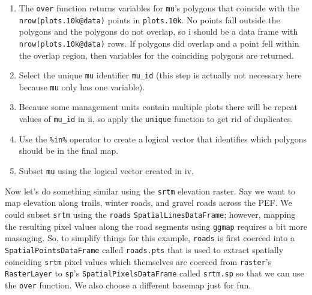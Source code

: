 \documentclass[
]{krantz}
\newenvironment{Shaded}{\begin{snugshade}}{\end{snugshade}}
\newcommand{\FloatTok}[1]{\textcolor[rgb]{0.00,0.00,0.81}{#1}}
\newcommand{\KeywordTok}[1]{\textcolor[rgb]{0.13,0.29,0.53}{\textbf{#1}}}
\newcommand{\NormalTok}[1]{#1}
\newcommand{\OperatorTok}[1]{\textcolor[rgb]{0.81,0.36,0.00}{\textbf{#1}}}
\newcommand{\StringTok}[1]{\textcolor[rgb]{0.31,0.60,0.02}{#1}}
\providecommand{\tightlist}{%
  \setlength{\itemsep}{0pt}\setlength{\parskip}{0pt}}
\begin{document}
\begin{Shaded}
\end{Shaded}

\begin{enumerate}
\def\labelenumi{\roman{enumi}.}
\tightlist
\item
  The \texttt{over} function returns variables for \texttt{mu}'s polygons that coincide with the \texttt{nrow(plots.10k@data)} points in \texttt{plots.10k}. No points fall outside the polygons and the polygons do not overlap, so i should be a data frame with \texttt{nrow(plots.10k@data)} rows. If polygons did overlap and a point fell within the overlap region, then variables for the coinciding polygons are returned.
\item
  Select the unique \texttt{mu} identifier \texttt{mu\_id} (this step is actually not necessary here because \texttt{mu} only has one variable).
\item
  Because some management units contain multiple plots there will be repeat values of \texttt{mu\_id} in ii, so apply the \texttt{unique} function to get rid of duplicates.
\item
  Use the \texttt{\%in\%} operator to create a logical vector that identifies which polygons should be in the final map.
\item
  Subset \texttt{mu} using the logical vector created in iv.
\end{enumerate}

Now let's do something similar using the \texttt{srtm} elevation raster. Say we want to map elevation along trails, winter roads, and gravel roads across the PEF. We could subset \texttt{srtm} using the \texttt{roads} \texttt{SpatialLinesDataFrame}; however, mapping the resulting pixel values along the road segments using \texttt{ggmap} requires a bit more massaging. So, to simplify things for this example, \texttt{roads} is first coerced into a \texttt{SpatialPointsDataFrame} called \texttt{roads.pts} that is used to extract spatially coinciding \texttt{srtm} pixel values which themselves are coerced from \texttt{raster}'s \texttt{RasterLayer} to \texttt{sp}'s \texttt{SpatialPixelsDataFrame} called \texttt{srtm.sp} so that we can use the \texttt{over} function. We also choose a different basemap just for fun.
\end{document}
